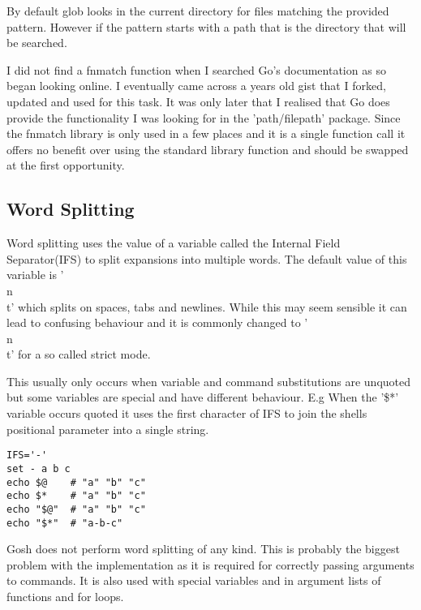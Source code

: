 By default glob looks in the current directory for files matching the provided pattern.
However if the pattern starts with a path that is the directory that will be searched.

I did not find a fnmatch function when I searched Go's documentation as so began looking online.
I eventually came across a years old gist that I forked, updated and used for this task.
It was only later that I realised that Go does provide the functionality I was looking for in the 'path/filepath' package.
Since the fnmatch library is only used in a few places and it is a single function call it offers no benefit over using the standard library function and should be swapped at the first opportunity. 

\subsection{Word Splitting}
Word splitting uses the value of a variable called the Internal Field Separator(IFS) to split expansions into multiple words.
The default value of this variable is ' \\n\\t' which splits on spaces, tabs and newlines.
While this may seem sensible it can lead to confusing behaviour and it is commonly changed to '\\n\\t'
for a so called strict mode.

This usually only occurs when variable and command substitutions are unquoted but some variables are special and have different behaviour.
E.g When the '\$*' variable occurs quoted it uses the first character of IFS to join the shells positional parameter into a single string.
\begin{verbatim}
IFS='-'
set - a b c
echo $@    # "a" "b" "c"
echo $*    # "a" "b" "c"
echo "$@"  # "a" "b" "c"
echo "$*"  # "a-b-c"
\end{verbatim}

Gosh does not perform word splitting of any kind.
This is probably the biggest problem with the implementation as it is required for correctly passing arguments to commands.
It is also used with special variables and in argument lists of functions and for loops.




